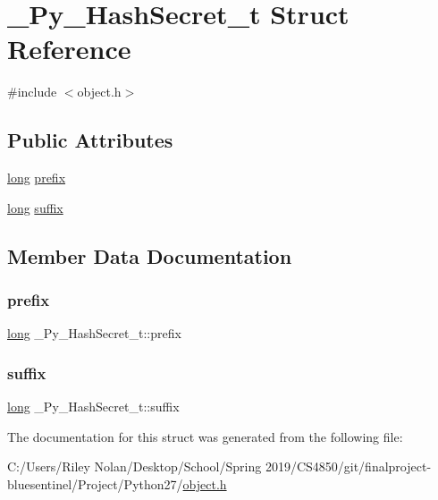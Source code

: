 \hypertarget{struct___py___hash_secret__t}{}\section{\+\_\+\+Py\+\_\+\+Hash\+Secret\+\_\+t Struct Reference}
\label{struct___py___hash_secret__t}


{\ttfamily \#include $<$object.\+h$>$}

\subsection*{Public Attributes}
\begin{DoxyCompactItemize}
\item 
\mbox{\hyperlink{modsupport_8h_a0cb68e00fb9fb1260ee2daadd9fe6611}{long}} \mbox{\hyperlink{struct___py___hash_secret__t_a0ad546fb64bf43faf3c26e39071e59a6}{prefix}}
\item 
\mbox{\hyperlink{modsupport_8h_a0cb68e00fb9fb1260ee2daadd9fe6611}{long}} \mbox{\hyperlink{struct___py___hash_secret__t_a461f92166b644173837271b974dd4610}{suffix}}
\end{DoxyCompactItemize}


\subsection{Member Data Documentation}
\mbox{\label{struct___py___hash_secret__t_a0ad546fb64bf43faf3c26e39071e59a6}} 
\subsubsection{\texorpdfstring{prefix}{prefix}}
{\footnotesize\ttfamily \mbox{\hyperlink{modsupport_8h_a0cb68e00fb9fb1260ee2daadd9fe6611}{long}} \+\_\+\+Py\+\_\+\+Hash\+Secret\+\_\+t\+::prefix}

\mbox{\label{struct___py___hash_secret__t_a461f92166b644173837271b974dd4610}} 
\subsubsection{\texorpdfstring{suffix}{suffix}}
{\footnotesize\ttfamily \mbox{\hyperlink{modsupport_8h_a0cb68e00fb9fb1260ee2daadd9fe6611}{long}} \+\_\+\+Py\+\_\+\+Hash\+Secret\+\_\+t\+::suffix}



The documentation for this struct was generated from the following file\+:\begin{DoxyCompactItemize}
\item 
C\+:/\+Users/\+Riley Nolan/\+Desktop/\+School/\+Spring 2019/\+C\+S4850/git/finalproject-\/bluesentinel/\+Project/\+Python27/\mbox{\hyperlink{_python27_2object_8h}{object.\+h}}\end{DoxyCompactItemize}
